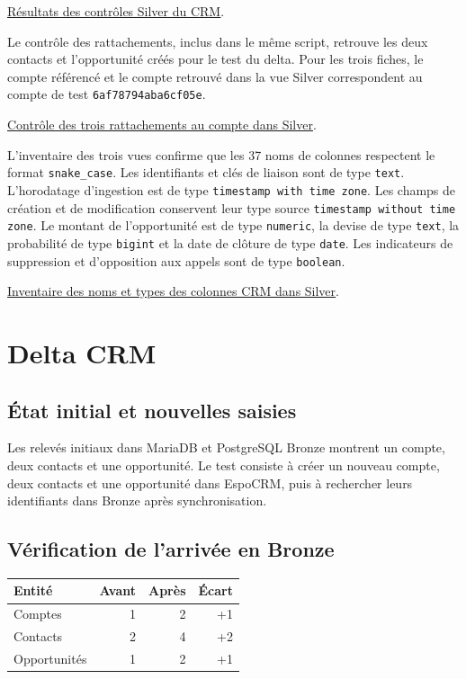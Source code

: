 \documentclass[11pt,a4paper]{article}
\newcommand{\code}[1]{\texttt{#1}}
\newcommand{\preuve}[2]{%
  \href{https://github.com/MAHDIghr/projet_big_data_starter/blob/27cc8348f6737a75bb24a40d6d8cda3ae54996b3/preuves/#1}{\textcolor{encre}{\underline{#2}}}}
\begin{document}
\preuve{crm/crm_06_controles_silver.png}{Résultats des contrôles Silver du CRM}.

Le contrôle des rattachements, inclus dans le même script, retrouve
les deux contacts et l'opportunité créés pour le test du delta.
Pour les trois fiches, le compte référencé et le compte retrouvé
dans la vue Silver correspondent au compte de test
\code{6af78794aba6cf05e}.

\preuve{crm/crm_07_rattachements_silver.png}{Contrôle des trois rattachements au compte dans Silver}.

L'inventaire des trois vues confirme que les 37 noms de colonnes
respectent le format \code{snake\_case}. Les identifiants et clés de
liaison sont de type \code{text}. L'horodatage d'ingestion est de type
\code{timestamp with time zone}. Les champs de création et de
modification conservent leur type source \code{timestamp without time zone}.
Le montant de l'opportunité est de type \code{numeric}, la devise de
type \code{text}, la probabilité de type \code{bigint} et la date de
clôture de type \code{date}. Les indicateurs de suppression et
d'opposition aux appels sont de type \code{boolean}.

\preuve{crm/crm_08_types_nommage_silver.png}{Inventaire des noms et types des colonnes CRM dans Silver}.

\section{Delta CRM}

\subsection{État initial et nouvelles saisies}

Les relevés initiaux dans MariaDB et PostgreSQL Bronze montrent un
compte, deux contacts et une opportunité. Le test consiste à créer
un nouveau compte, deux contacts et une opportunité dans EspoCRM,
puis à rechercher leurs identifiants dans Bronze après synchronisation.

\subsection{Vérification de l'arrivée en Bronze}

\begin{tabularx}{\linewidth}{@{}Xrrr@{}}
\toprule
Entité & Avant & Après & Écart \\
\midrule
Comptes & 1 & 2 & +1 \\
Contacts & 2 & 4 & +2 \\
Opportunités & 1 & 2 & +1 \\
\bottomrule
\end{tabularx}
\end{document}
